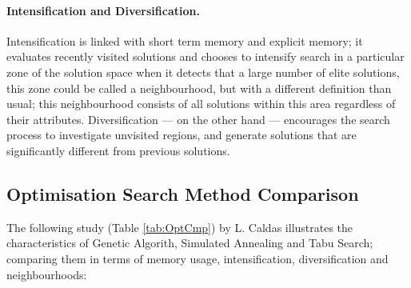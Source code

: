 \paragraph{Intensification and Diversification.} Intensification is linked with short term memory and explicit memory; it evaluates recently visited solutions and chooses to intensify search in a particular zone of the solution space when it detects that a large number of elite solutions, this zone could be called a neighbourhood, but with a different definition than usual; this neighbourhood consists of all solutions within this area regardless of their attributes. Diversification --- on the other hand --- encourages the search process to investigate unvisited regions, and generate solutions that are significantly different from previous solutions.

\subsection{Optimisation Search Method Comparison}
\label{subsec:OptimComp}

The following study (Table \ref{tab:OptCmp}) by L. Caldas \cite{caldas01} illustrates the characteristics of Genetic Algorith, Simulated Annealing and Tabu Search; comparing them in terms of memory usage, intensification, diversification and neighbourhoods:

